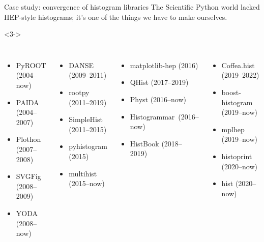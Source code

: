 \documentclass[aspectratio=169]{beamer}
\begin{document}
\begin{frame}{Case study: convergence of histogram libraries}
\vspace{0.5 cm}
The Scientific Python world lacked HEP-style histograms; it's one of the things we have to make ourselves.

\vspace{0.5 cm}

\vspace{0.5 cm}

\vspace{0.5 cm}
\begin{uncoverenv}<3->
\begin{columns}
\scriptsize
{}
\begin{itemize}
\item PyROOT (2004--now)
\item PAIDA (2004--2007)
\item Plothon (2007--2008)
\item SVGFig (2008--2009)
\item YODA (2008--now)
\end{itemize}

\begin{itemize}
\item DANSE (2009--2011)
\item rootpy (2011--2019)
\item SimpleHist (2011--2015)
\item pyhistogram (2015)
\item multihist (2015--now)
\end{itemize}

\begin{itemize}
\item matplotlib-hep (2016)
\item QHist (2017--2019)
\item Physt (2016--now)
\item \mbox{Histogrammar (2016--now)\hspace{-0.2 cm}}
\item HistBook (2018--2019)
\end{itemize}

\begin{itemize}
\item Coffea.hist (2019--2022)
\item boost-histogram (2019--now)
\item mplhep (2019--now)
\item histoprint (2020--now)
\item hist (2020--now)
\end{itemize}

\end{columns}
\end{uncoverenv}
\end{frame}
\end{document}
